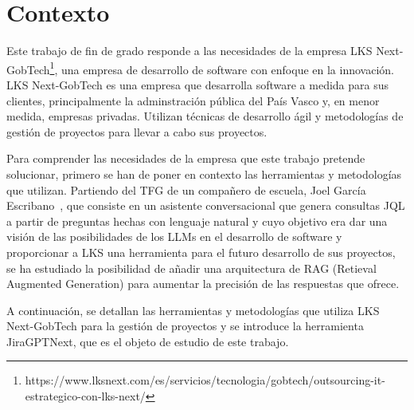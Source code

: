 \section{Contexto}

Este trabajo de fin de grado responde a las necesidades de la empresa LKS Next-GobTech\footnote{https://www.lksnext.com/es/servicios/tecnologia/gobtech/outsourcing-it-estrategico-con-lks-next/}, una empresa de desarrollo de software con enfoque en la innovación. LKS Next-GobTech es una empresa que desarrolla software a medida para sus clientes, principalmente la adminstración pública del País Vasco y, en menor medida, empresas privadas. Utilizan técnicas de desarrollo ágil y metodologías de gestión de proyectos para llevar a cabo sus proyectos.

Para comprender las necesidades de la empresa que este trabajo pretende solucionar, primero se han de poner en contexto las herramientas y metodologías que utilizan. Partiendo del TFG de un compañero de escuela, Joel García Escribano~\cite{jiragpt}, que consiste en un asistente conversacional que genera consultas JQL a partir de preguntas hechas con lenguaje natural y cuyo objetivo era dar una visión de las posibilidades de los LLMs en el desarrollo de software y proporcionar a LKS una herramienta para el futuro desarrollo de sus proyectos, se ha estudiado la posibilidad de añadir una arquitectura de RAG (Retieval Augmented Generation) para aumentar la precisión de las respuestas que ofrece.

A continuación, se detallan las herramientas y metodologías que utiliza LKS Next-GobTech para la gestión de proyectos y se introduce la herramienta JiraGPTNext, que es el objeto de estudio de este trabajo.



